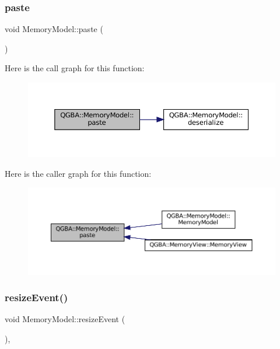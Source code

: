 \subsubsection{\texorpdfstring{paste}{paste}}
{\footnotesize\ttfamily void Memory\+Model\+::paste (\begin{DoxyParamCaption}{ }\end{DoxyParamCaption})\hspace{0.3cm}{\ttfamily [slot]}}

Here is the call graph for this function\+:
\nopagebreak
\begin{figure}[H]
\begin{center}
\leavevmode
\includegraphics[width=350pt]{class_q_g_b_a_1_1_memory_model_a9160c33072a3eb745beb90c39cf1d01b_cgraph}
\end{center}
\end{figure}
Here is the caller graph for this function\+:
\nopagebreak
\begin{figure}[H]
\begin{center}
\leavevmode
\includegraphics[width=350pt]{class_q_g_b_a_1_1_memory_model_a9160c33072a3eb745beb90c39cf1d01b_icgraph}
\end{center}
\end{figure}
\mbox{\label{class_q_g_b_a_1_1_memory_model_aa4c1e00ada913a74ea17b1d81ebe6bd0}} 
\subsubsection{\texorpdfstring{resize\+Event()}{resizeEvent()}}
{\footnotesize\ttfamily void Memory\+Model\+::resize\+Event (\begin{DoxyParamCaption}\item[{Q\+Resize\+Event $\ast$}]{ }\end{DoxyParamCaption})\hspace{0.3cm}{\ttfamily [override]}, {\ttfamily [protected]}}


